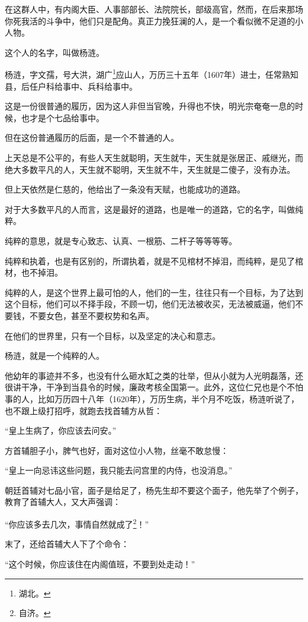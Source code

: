 \begin{multicols}{\theparacolNo}
		在这群人中，有内阁大臣、人事部部长、法院院长，部级高官，然而，在后来那场你死我活的斗争中，他们只是配角。真正力挽狂澜的人，是一个看似微不足道的小人物。

		这个人的名字，叫做杨涟。

		杨涟，字文孺，号大洪，湖广\footnote{湖北。}应山人，万历三十五年（1607年）进士，任常熟知县，后任户科给事中、兵科给事中。

		这是一份很普通的履历，因为这人非但当官晚，升得也不快，明光宗奄奄一息的时候，也才是个七品给事中。

		但在这份普通履历的后面，是一个不普通的人。

		上天总是不公平的，有些人天生就聪明，天生就牛，天生就是张居正、戚继光，而绝大多数平凡的人，天生就不聪明，天生就不牛，天生就是二傻子，没有办法。

		但上天依然是仁慈的，他给出了一条没有天赋，也能成功的道路。

		对于大多数平凡的人而言，这是最好的道路，也是唯一的道路，它的名字，叫做纯粹。

		纯粹的意思，就是专心致志、认真、一根筋、二杆子等等等等。

		纯粹和执着，也是有区别的，所谓执着，就是不见棺材不掉泪，而纯粹，是见了棺材，也不掉泪。

		纯粹的人，是这个世界上最可怕的人，他们的一生，往往只有一个目标，为了达到这个目标，他们可以不择手段，不顾一切，他们无法被收买，无法被威逼，他们不要钱，不要女色，甚至不要权势和名声。

		在他们的世界里，只有一个目标，以及坚定的决心和意志。

		杨涟，就是一个纯粹的人。

		他幼年的事迹并不多，也没有什么砸水缸之类的壮举，但从小就为人光明磊落，还很讲干净，干净到当县令的时候，廉政考核全国第一。此外，这位仁兄也是个不怕事的人，比如万历四十八年（1620年），万历生病，半个月不吃饭，杨涟听说了，也不跟上级打招呼，就跑去找首辅方从哲：

		“皇上生病了，你应该去问安。”

		方首辅胆子小，脾气也好，面对这位小人物，丝毫不敢怠慢：

		“皇上一向忌讳这些问题，我只能去问宫里的内侍，也没消息。”

		朝廷首辅对七品小官，面子是给足了，杨先生却不要这个面子，他先举了个例子，教育了首辅大人，又大声强调：

		“你应该多去几次，事情自然就成了\footnote{自济。}！”

		末了，还给首辅大人下了个命令：

		“这个时候，你应该住在内阁值班，不要到处走动！”


\end{multicols}
